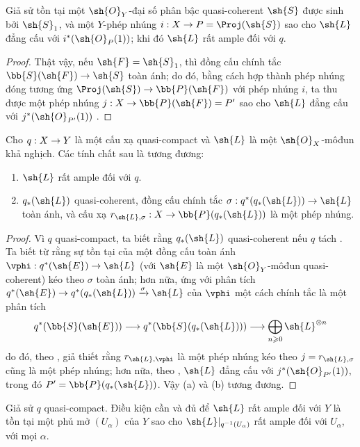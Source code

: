 \documentclass[oneside,10pt]{amsart}
\makeatletter
\renewcommand{\geq}{\geqslant}
\newcommand{\ega@arrow}[2]{\mathchoice{#1}{#2}{#2}{#2}}
\renewcommand{\to}{\ega@arrow{\longrightarrow}{\rightarrow}}
\newcommand{\oldpage}[2][]{\marginnote{\normalfont\footnotesize\textbf{#1}~|~#2}\ignorespaces}
\let\EGAOriginalLabel\label
\renewcommand{\label}[1]{\phantomsection\EGAOriginalLabel{#1}}
\makeatother
\begin{document}
\begin{corollary}[4.4.3]
\label{II.4.4.3}
Giả sử tồn tại một $\sh{O}_Y$-đại số phân bậc quasi-coherent $\sh{S}$ được sinh bởi $\sh{S}_1$, và một $Y$-phép nhúng $i:X\to P=\Proj(\sh{S})$ sao cho $\sh{L}$ đẳng cấu với $i^*(\sh{O}_P(1))$;
khi đó $\sh{L}$ rất ample đối với $q$.
\end{corollary}

\begin{proof}
Thật vậy, nếu $\sh{F}=\sh{S}_1$, thì đồng cấu chính tắc $\bb{S}(\sh{F})\to\sh{S}$ toàn ánh; do đó, bằng cách hợp thành phép nhúng đóng tương ứng $\Proj(\sh{S})\to\bb{P}(\sh{F})$  với phép nhúng $i$, ta thu được một phép nhúng $j:X\to\bb{P}(\sh{F})=P'$ sao cho $\sh{L}$ đẳng cấu với $j^*(\sh{O}_{P'}(1))$ .
\end{proof}

\begin{proposition}[4.4.4]
\label{II.4.4.4}
Cho $q:X\to Y$ là một cấu xạ quasi-compact và $\sh{L}$ là một $\sh{O}_X$-môđun khả nghịch.
Các tính chất sau là tương đương:
\begin{enumerate}
  \item[\rm{(a)}] $\sh{L}$ rất ample đối với $q$.
  \item[\rm{(b)}] $q_*(\sh{L})$ quasi-coherent, đồng cấu chính tắc $\sigma:q^*(q_*(\sh{L}))\to\sh{L}$ toàn ánh, và cấu xạ $r_{\sh{L},\sigma}:X\to\bb{P}(q_*(\sh{L}))$ là một phép nhúng.
\end{enumerate}
\end{proposition}

\begin{proof}
Vì $q$ quasi-compact, ta biết rằng $q_*(\sh{L})$ quasi-coherent nếu $q$ tách .
\oldpage[II]{80}
Ta biết từ  rằng sự tồn tại của một đồng cấu toàn ánh $\vphi:q^*(\sh{E})\to\sh{L}$ (với $\sh{E}$ là một $\sh{O}_Y$-môđun quasi-coherent) kéo theo $\sigma$ toàn ánh;
hơn nữa, ứng với phân tích $q^*(\sh{E})\to q^*(q_*(\sh{L}))\xrightarrow{\sigma}\sh{L}$ của $\vphi$ một cách chính tắc là một phân tích
\[
  q^*(\bb{S}(\sh{E}))\to q^*(\bb{S}(q_*(\sh{L})))\to\bigoplus_{n\geq0}\sh{L}^{\otimes n}
\]
do đó, theo , giả thiết rằng $r_{\sh{L},\vphi}$ là một phép nhúng kéo theo $j=r_{\sh{L},\sigma}$ cũng là một phép nhúng;
hơn nữa, theo , $\sh{L}$ đẳng cấu với $j^*(\sh{O}_{P'}(1))$, trong đó $P'=\bb{P}(q_*(\sh{L}))$.
Vậy (a) và (b) tương đương.
\end{proof}

\begin{corollary}[4.4.5]
\label{II.4.4.5}
Giả sử $q$ quasi-compact.
Điều kiện cần và đủ để $\sh{L}$ rất ample đối với $Y$ là tồn tại một phủ mở $(U_\alpha)$ của $Y$ sao cho $\sh{L}|_{q^{-1}(U_\alpha)}$ rất ample đối với $U_\alpha$, với mọi $\alpha$.
\end{corollary}
\end{document}
